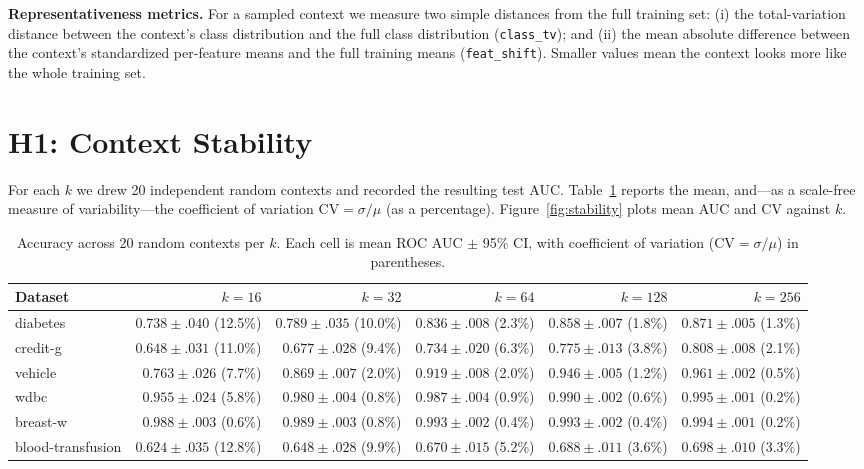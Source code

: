 \documentclass[11pt,a4paper]{article}
\begin{document}
\textbf{Representativeness metrics.} For a sampled context we measure two simple
distances from the full training set: (i) the total-variation distance between
the context's class distribution and the full class distribution
(\texttt{class\_tv}); and (ii) the mean absolute difference between the
context's standardized per-feature means and the full training means
(\texttt{feat\_shift}). Smaller values mean the context looks more like the
whole training set.

\section{H1: Context Stability}

For each $k$ we drew 20 independent random contexts and recorded the resulting
test AUC. Table~\ref{tab:stability} reports the mean, and---as a scale-free
measure of variability---the coefficient of variation
$\mathrm{CV}=\sigma/\mu$ (as a percentage). Figure~\ref{fig:stability} plots
mean AUC and CV against $k$.

\begin{table}[h]
\centering
\caption{Accuracy across 20 random contexts per $k$. Each cell is
mean ROC AUC $\pm$ 95\% CI, with coefficient of variation
($\mathrm{CV}=\sigma/\mu$) in parentheses.}
\label{tab:stability}
\begin{tabular}{lrrrrr}
\toprule
Dataset & $k{=}16$ & $k{=}32$ & $k{=}64$ & $k{=}128$ & $k{=}256$ \\
\midrule
diabetes          & $0.738{\pm}.040$ (12.5\%) & $0.789{\pm}.035$ (10.0\%) & $0.836{\pm}.008$ (2.3\%) & $0.858{\pm}.007$ (1.8\%) & $0.871{\pm}.005$ (1.3\%) \\
credit-g          & $0.648{\pm}.031$ (11.0\%) & $0.677{\pm}.028$ (9.4\%)  & $0.734{\pm}.020$ (6.3\%) & $0.775{\pm}.013$ (3.8\%) & $0.808{\pm}.008$ (2.1\%) \\
vehicle           & $0.763{\pm}.026$ (7.7\%)  & $0.869{\pm}.007$ (2.0\%)  & $0.919{\pm}.008$ (2.0\%) & $0.946{\pm}.005$ (1.2\%) & $0.961{\pm}.002$ (0.5\%) \\
wdbc              & $0.955{\pm}.024$ (5.8\%)  & $0.980{\pm}.004$ (0.8\%)  & $0.987{\pm}.004$ (0.9\%) & $0.990{\pm}.002$ (0.6\%) & $0.995{\pm}.001$ (0.2\%) \\
breast-w          & $0.988{\pm}.003$ (0.6\%)  & $0.989{\pm}.003$ (0.8\%)  & $0.993{\pm}.002$ (0.4\%) & $0.993{\pm}.002$ (0.4\%) & $0.994{\pm}.001$ (0.2\%) \\
blood-transfusion & $0.624{\pm}.035$ (12.8\%) & $0.648{\pm}.028$ (9.9\%)  & $0.670{\pm}.015$ (5.2\%) & $0.688{\pm}.011$ (3.6\%) & $0.698{\pm}.010$ (3.3\%) \\
\bottomrule
\end{tabular}
\end{table}
\end{document}
